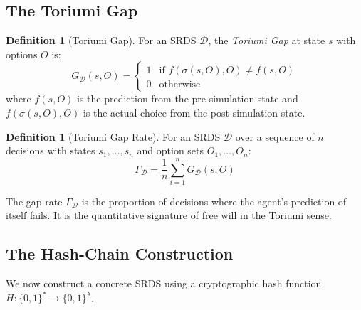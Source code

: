 \documentclass[12pt,a4paper]{article}
\theoremstyle{definition}
\newtheorem{definition}[theorem]{Definition}
\theoremstyle{remark}
\newcommand{\cD}{\mathcal{D}}
\newcommand{\GapDef}{\ensuremath{G_{\cD}(s, O)}}
\begin{document}
\subsection{The Toriumi Gap}

\begin{definition}[Toriumi Gap]
For an SRDS $\cD$, the \emph{Toriumi Gap} at state $s$ with options $O$ is:
\begin{equation}
\GapDef =
\begin{cases}
1 & \text{if } f(\sigma(s, O), O) \neq f(s, O) \\
0 & \text{otherwise}
\end{cases}
\end{equation}
where $f(s, O)$ is the prediction from the pre-simulation state and
$f(\sigma(s, O), O)$ is the actual choice from the post-simulation state.
\end{definition}

\begin{definition}[Toriumi Gap Rate]
For an SRDS $\cD$ over a sequence of $n$ decisions with states
$s_1, \ldots, s_n$ and option sets $O_1, \ldots, O_n$:
\begin{equation}
\Gamma_{\cD} = \frac{1}{n} \sum_{i=1}^{n} \GapDef
\end{equation}
\end{definition}

The gap rate $\Gamma_{\cD}$ is the proportion of decisions where the agent's
prediction of itself fails. It is the quantitative signature of free will in
the Toriumi sense.

\subsection{The Hash-Chain Construction}

We now construct a concrete SRDS using a cryptographic hash function
$H: \{0,1\}^* \to \{0,1\}^\lambda$.
\end{document}

